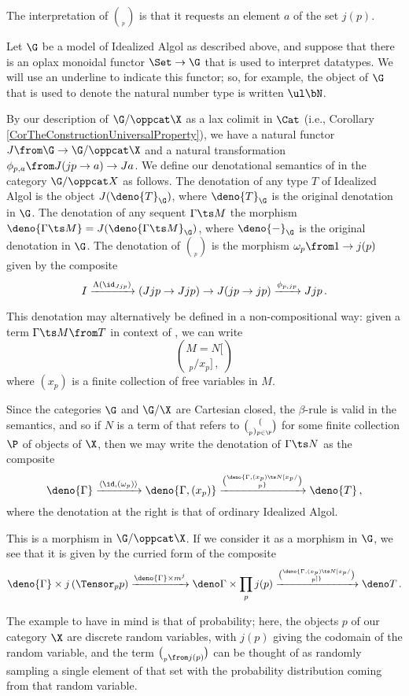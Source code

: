 The interpretation of $\choose_p$ is that it requests an element $a$ of the set $j(p)$.

Let $\G$ be a model of Idealized Algol as described above, and suppose that there is an oplax monoidal functor $\Set \to \G$ that is used to interpret datatypes.  
We will use an underline to indicate this functor; so, for example, the object of $\G$ that is used to denote the natural number type is written $\ul\bN$.

By our description of $\G/\oppcat \X$ as a lax colimit in $\Cat$ (i.e., Corollary \ref{CorTheConstructionUniversalProperty}), we have a natural functor $J\from \G\to\G/\oppcat \X$ and a natural transformation $\phi_{p,a}\from J(jp\to a) \to Ja$.  
We define our denotational semantics of \IAXX in the category $\G/\oppcat X$ as follows.  
The denotation of any type $T$ of Idealized Algol is the object $J(\deno{T}_\G)$, where $\deno{T}_\G$ is the original denotation in $\G$.
The denotation of any sequent $\Gamma\ts M$ the morphism $\deno{\Gamma\ts M} = J(\deno{\Gamma\ts M}_\G)$, where $\deno{-}_\G$ is the original denotation in $\G$.
The denotation of $\choose_p$ is the morphism $\omega_p \from 1 \to j(p)$ given by the composite
\[
  I \xrightarrow{\Lambda(\id_{Jjp})} (Jjp \to Jjp)  \to J(jp \to jp) \xrightarrow{\phi_{p,jp}} Jjp\,.
  \]

This denotation may alternatively be defined in a non-compositional way: given a term $\Gamma\ts M\from T$ in context of \IAXX, we can write
\[
  M = N[\choose_p/x_p]\,,
  \]
where $(x_p)$ is a finite collection of free variables in $M$.

Since the categories $\G$ and $\G/\X$ are Cartesian closed, the $\beta$-rule is valid in the semantics, and so if $N$ is a term of \IAXX that refers to $(\choose_p)_{p\in\P}$ for some finite collection $\P$ of objects of $\X$, then we may write the denotation of $\Gamma \ts N$ as the composite
\[
  \deno{\Gamma} \xrightarrow{\langle \id,(\omega_p)\rangle} \deno{\Gamma,(x_p)} \xrightarrow{\deno{\Gamma,(x_p)\ts N[x_p/\choose_p}} \deno{T}\,,
  \]
where the denotation at the right is that of ordinary Idealized Algol.

This is a morphism in $\G/\oppcat\X$.  
If we consider it as a morphism in $\G$, we see that it is given by the curried form of the composite
\[
  \deno{\Gamma}\times j\left(\Tensor_p p\right) \xrightarrow{\deno{\Gamma}\times m^j} \deno \Gamma \times \prod_p j(p) \xrightarrow{\deno{\Gamma,(x_p)\ts N[x_p/\choose_p]}} \deno T\,.
  \]

The example to have in mind is that of probability; here, the objects $p$ of our category $\X$ are discrete random variables, with $j(p)$ giving the codomain of the random variable, and the term $\choose_p\from j(p)$ can be thought of as randomly sampling a single element of that set with the probability distribution coming from that random variable.

